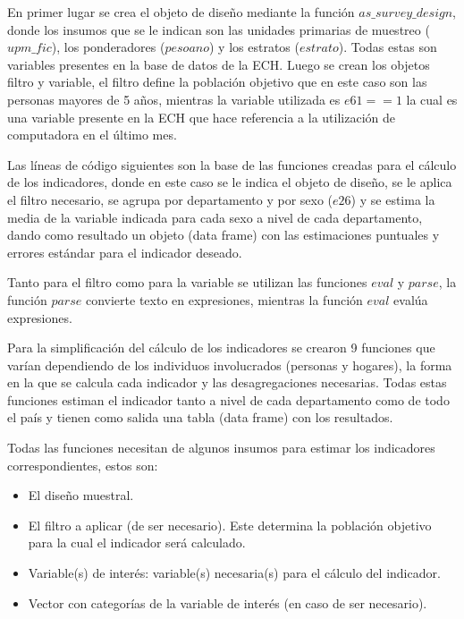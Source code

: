 \documentclass[12pt,twoside,spanish,a4paper]{book}\usepackage[]{graphicx}\usepackage[]{color}
\begin{document}
En primer lugar se crea el objeto de diseño mediante la función $as\_survey\_design$, donde los insumos que se le indican son las unidades primarias de muestreo ($upm\_fic$), los ponderadores ($pesoano$) y los estratos ($estrato$). Todas estas son variables presentes en la base de datos de la ECH. Luego se crean los objetos filtro y variable, el filtro define la población objetivo que en este caso son las personas mayores de 5 años, mientras la variable utilizada es $e61==1$ la cual es una variable presente en la ECH que hace referencia a la utilización de computadora en el último mes.

Las líneas de código siguientes son la base de las funciones creadas para el cálculo de los indicadores, donde en este caso se le indica el objeto de diseño, se le aplica el filtro necesario, se agrupa por departamento y por sexo ($e26$) y se estima la media de la variable indicada para cada sexo a nivel de cada departamento, dando como resultado un objeto (data frame) con las estimaciones puntuales y errores estándar para el indicador deseado.

Tanto para el filtro como para la variable se utilizan las funciones $eval$ y $parse$, la función $parse$ convierte texto en expresiones, mientras la función $eval$ evalúa expresiones.

Para la simplificación del cálculo de los indicadores se crearon 9 funciones que varían dependiendo de los individuos involucrados (personas y hogares), la forma en la que se calcula cada indicador y las desagregaciones necesarias. Todas estas funciones estiman el indicador tanto a nivel de cada departamento como de todo el país y tienen como salida una tabla (data frame) con los resultados.

Todas las funciones necesitan de algunos insumos para estimar los indicadores correspondientes, estos son: 

\begin{itemize}
\item El diseño muestral.
\item El filtro a aplicar (de ser necesario). Este determina la población objetivo para la cual el indicador será calculado.
\item Variable(s) de interés: variable(s) necesaria(s) para el cálculo del indicador.
\item Vector con categorías de la variable de interés (en caso de ser necesario).

\end{itemize}
\end{document}
